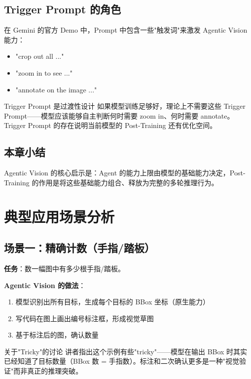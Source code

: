 \documentclass[a4paper]{article}
\begin{document}
\subsection{Trigger Prompt 的角色}

在 Gemini 的官方 Demo 中，Prompt 中包含一些"触发词"来激发 Agentic Vision 能力：

\begin{itemize}
    \item "crop out all ..."
    \item "zoom in to see ..."
    \item "annotate on the image ..."
\end{itemize}

\begin{knowledgebox}{Trigger Prompt 是过渡性设计}
如果模型训练足够好，理论上不需要这些 Trigger Prompt——模型应该能够自主判断何时需要 zoom in、何时需要 annotate。Trigger Prompt 的存在说明当前模型的 Post-Training 还有优化空间。
\end{knowledgebox}

\subsection{本章小结}

Agentic Vision 的核心启示是：Agent 的能力上限由模型的基础能力决定，Post-Training 的作用是将这些基础能力组合、释放为完整的多轮推理行为。


\section{典型应用场景分析}

\subsection{场景一：精确计数（手指/踏板）}

\textbf{任务}：数一幅图中有多少根手指/踏板。

\textbf{Agentic Vision 的做法}：
\begin{enumerate}
    \item 模型识别出所有目标，生成每个目标的 BBox 坐标（原生能力）
    \item 写代码在图上画出编号标注框，形成视觉草图
    \item 基于标注后的图，确认数量
\end{enumerate}

\begin{warningbox}{关于"Tricky"的讨论}
讲者指出这个示例有些"tricky"——模型在输出 BBox 时其实已经知道了目标数量（BBox 数 = 手指数）。标注和二次确认更多是一种"视觉验证"而非真正的推理突破。
\end{warningbox}
\end{document}
